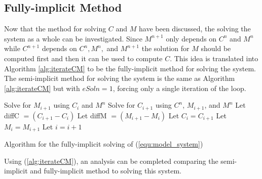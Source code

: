   \subsection{Fully-implicit Method}
  Now that the method for solving $C$ and $M$ have been discussed, the solving the system as a whole can be investigated. 
  Since $M^{n+1}$ only depends on $C^n$ and $M^{n}$ while $C^{n+1}$ depends on $C^{n}, M^{n},$ and $M^{n+1}$ the solution for $M$ should be computed first and then it can be used to compute $C$. 
  This idea is translated into Algorithm \ref{alg:iterateCM} to be the fully-implicit method for solving the system.
  The semi-implicit method for solving the system is the same as Algorithm \ref{alg:iterateCM} but with $eSoln = 1$, forcing only a single iteration of the loop.

  \begin{algorithm}[h!tb]
    \Begin
    {
      {
          Solve for $M_{i+1}$ using $C_{i}$ and $M^{n}$\;
          Solve for $C_{i+1}$ using $C^{n}$, $M_{i+1}$, and $M^{n}$\;
          Let diffC $=  (C_{i+1} - C_i)$\;
          Let diffM $= (M_{i+1} - M_i)$\;
          Let $C_{i} = C_{i+1}$\;
          Let $M_{i} = M_{i+1}$\;
          Let $i = i + 1 $\;
      }
    }
    \caption{Algorithm for the fully-implicit solving of (\ref{equ:model_system}) }
    \label{alg:iterateCM}
  \end{algorithm}


  Using (\ref{alg:iterateCM}), an analysis can be completed comparing the semi-implicit and fully-implicit method to solving this system. 


